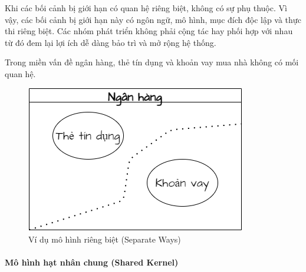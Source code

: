 Khi các bối cảnh bị giới hạn có quan hệ riêng biệt, không có sự phụ thuộc. Vì vậy, các bối cảnh bị giới hạn này có ngôn ngữ, mô hình, mục đích độc lập và thực thi riêng biệt. Các nhóm phát triển không phải cộng tác hay phối hợp với nhau từ đó đem lại lợi ích dễ dàng bảo trì và mở rộng hệ thống.

\begin{example} Trong miền vấn đề ngân hàng, thẻ tín dụng và khoản vay mua nhà không có mối quan hệ.

    \begin{figure}[H]

    \centering

    \includegraphics[scale = 0.5]{pictures/mo_hinh_rieng_biet_separate_ways/main.drawio.png}

    \caption{Ví dụ mô hình riêng biệt (Separate Ways)}

    \end{figure}

\end{example}


\paragraph{Mô hình hạt nhân chung (Shared Kernel)}




